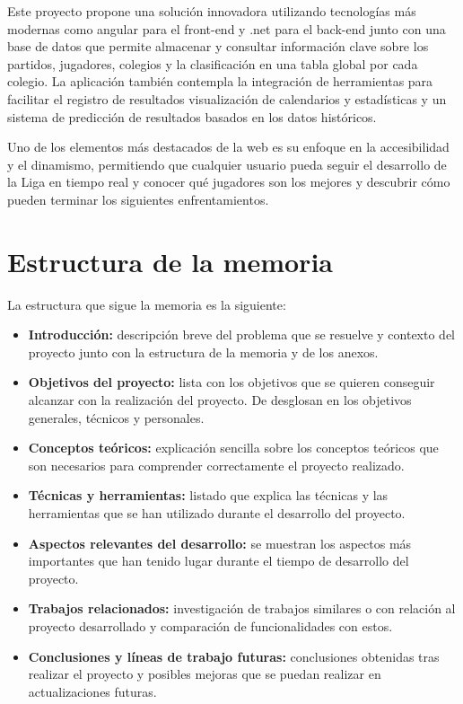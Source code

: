 Este proyecto propone una solución innovadora utilizando tecnologías más modernas como angular para el front-end y .net para el back-end junto con una base de datos que permite almacenar y consultar información clave sobre los partidos, jugadores, colegios y la clasificación en una tabla global por cada colegio. La aplicación también contempla la integración de herramientas para facilitar el registro de resultados visualización de calendarios y estadísticas y un sistema de predicción de resultados basados en los datos históricos.

Uno de los elementos más destacados de la web es su enfoque en la accesibilidad y el dinamismo, permitiendo que cualquier usuario pueda seguir el desarrollo de la Liga en tiempo real y conocer qué jugadores son los mejores y descubrir cómo pueden terminar los siguientes enfrentamientos.

\section{Estructura de la memoria}\label{estructura-de-la-memoria}

La estructura que sigue la memoria es la siguiente:

\begin{itemize}
\tightlist
\item
  \textbf{Introducción:} descripción breve del problema que se resuelve y contexto del proyecto junto con la estructura de la memoria y de los anexos.
\item
  \textbf{Objetivos del proyecto:} lista con los objetivos que se quieren conseguir alcanzar con la realización del proyecto. De desglosan en los objetivos generales, técnicos y personales.
\item
  \textbf{Conceptos teóricos:} explicación sencilla sobre los conceptos teóricos que son necesarios para comprender correctamente el proyecto realizado.
\item
  \textbf{Técnicas y herramientas:} listado que explica las técnicas y las herramientas que se han utilizado durante el desarrollo del proyecto.
\item
  \textbf{Aspectos relevantes del desarrollo:} se muestran los aspectos más importantes que han tenido lugar durante el tiempo de desarrollo del proyecto.
\item
  \textbf{Trabajos relacionados:} investigación de trabajos similares o con relación al proyecto desarrollado y comparación de funcionalidades con estos.
\item
  \textbf{Conclusiones y líneas de trabajo futuras:} conclusiones obtenidas tras realizar el proyecto y posibles mejoras que se puedan realizar en actualizaciones futuras.
\end{itemize}



